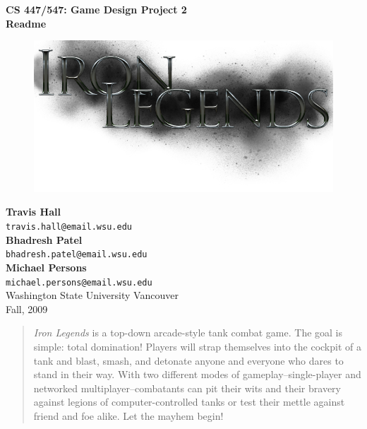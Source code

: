 \documentclass[letterpaper,11pt,twoside]{article}
\begin{document}
\begin{titlepage}
   \begin{center}
       {\large \textbf{CS 447/547: Game Design Project 2}}\\[0.5cm]
       {\large \textbf{Readme}}\\[3.0cm]

        \begin{figure}[htb]
	        \centering
	        \includegraphics[width=\textwidth]{logo.png}
        \end{figure} 

       \textbf{Travis Hall}\\
       \texttt{travis.hall@email.wsu.edu}\\[0.5cm]
       \textbf{Bhadresh Patel}\\
       \texttt{bhadresh.patel@email.wsu.edu}\\[0.5cm]
       \textbf{Michael Persons}\\
       \texttt{michael.persons@email.wsu.edu}\\[0.5cm]

       \vfill
       Washington State University Vancouver\\
       Fall, 2009
   \end{center}
\end{titlepage}

\begin{abstract}
\emph{Iron Legends} is a top-down arcade-style tank combat game. The goal is simple: total domination! Players will strap themselves into the cockpit of a tank and blast, smash, and detonate anyone and everyone who dares to stand in their way. With two different modes of gameplay--single-player and networked multiplayer--combatants can pit their wits and their bravery against legions of computer-controlled tanks or test their mettle against friend and foe alike. Let the mayhem begin!
\end{abstract}
\end{document}
